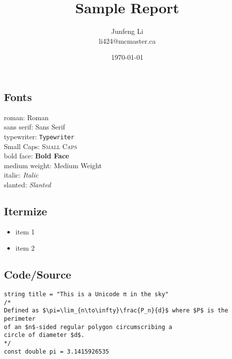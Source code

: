 \documentclass{article}
\title{Sample Report}
\author{Junfeng Li \\ li424@mcmaster.ca}
\date{\today}
\begin{document}
\maketitle

\subsection{Fonts}

roman: \textrm{Roman} \\
sans serif: \textsf{Sans Serif} \\
typewriter: \texttt{Typewriter} \\
Small Caps: \textsc{Small Caps} \\
bold face: \textbf{Bold Face} \\
medium weight: \textmd{Medium Weight} \\
italic: \textit{Italic} \\
slanted: \textsl{Slanted} \\

\subsection{Itermize}

\begin{itemize}
\item item 1
\item item 2
\end{itemize}

\subsection{Code/Source}

\begin{verbatim}
string title = "This is a Unicode π in the sky"
/*
Defined as $\pi=\lim_{n\to\infty}\frac{P_n}{d}$ where $P$ is the perimeter
of an $n$-sided regular polygon circumscribing a
circle of diameter $d$.
*/
const double pi = 3.1415926535
\end{verbatim}
\end{document}
